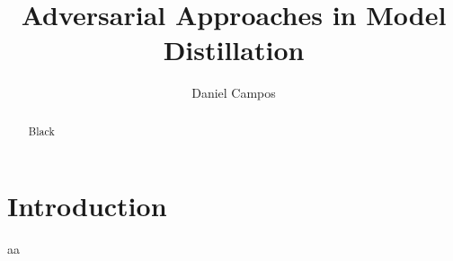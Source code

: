 \documentclass{llncs}
\title{Adversarial Approaches in Model Distillation}
\author{Daniel Campos}
\institute{University of Illinois Urbana Champaign  \email{dcampos3@illinois.edu}}
\begin{document}
\maketitle

\begin{abstract}
Black
\end{abstract}
\section{Introduction}
aa
\end{document}
